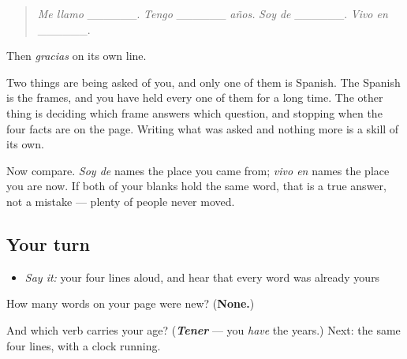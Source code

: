 \begin{quote}
\emph{Me llamo} \_\_\_\_\_\_. \emph{Tengo} \_\_\_\_\_\_ \emph{años.} \emph{Soy de} \_\_\_\_\_\_. \emph{Vivo en} \_\_\_\_\_\_.
\end{quote}

Then \emph{gracias} on its own line.

Two things are being asked of you, and only one of them is Spanish. The Spanish is the frames, and you have held every one of them for a long time. The other thing is deciding which frame answers which question, and stopping when the four facts are on the page. Writing what was asked and nothing more is a skill of its own.

Now compare. \emph{Soy de} names the place you came from; \emph{vivo en} names the place you are now. If both of your blanks hold the same word, that is a true answer, not a mistake — plenty of people never moved.

\subsection*{Your turn}
\begin{itemize}
\raggedright
  \item \emph{Say it:} your four lines aloud, and hear that every word was already yours
\end{itemize}

\begin{tcolorbox}[breakable,colback=teal!4,colframe=teal!35!black,title={Before you move on}]
How many words on your page were new? (\textbf{None.})

And which verb carries your age? (\emph{\textbf{Tener}} — you \emph{have} the years.) Next: the same four lines, with a clock running.
\end{tcolorbox}
